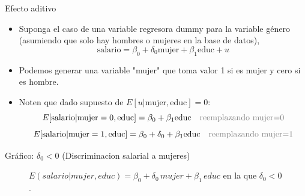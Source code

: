 \documentclass{beamer}
\begin{document}
\begin{frame}{Efecto aditivo}
    \begin{itemize}
        \item Suponga el caso de una variable regresora dummy para la variable género (asumiendo que solo hay hombres o mujeres en la base de datos),
        \[
        \text{salario} = \beta_0 + \delta_0 \text{mujer} + \beta_1 \text{educ} + u
        \]
        \item Podemos generar una variable "mujer" que toma valor 1 si es mujer y cero si es hombre.
        \item Noten que dado supuesto de \( E[u | \text{mujer}, \text{educ}] = 0 \):
        \[
        E[\text{salario} | \text{mujer} = 0, \text{educ}] = \beta_0 + \beta_1 \text{educ} \quad \textcolor{gray}{\text{reemplazando mujer=0}}
        \]
        \[
        E[\text{salario} | \text{mujer} = 1, \text{educ}] = \beta_0 + \delta_0 + \beta_1 \text{educ} \quad \textcolor{gray}{\text{reemplazando mujer=1}}
        \]
    \end{itemize}
\end{frame}


\begin{frame}{Gráfico: \(\delta_0 < 0\) (Discriminacion salarial a mujeres)}

\begin{figure}[h!]
\centering
{}
\caption{$E(salario| mujer, educ) = \beta_0 + \delta_0 \, mujer + \beta_1 \, educ$ en la que $\delta_0 < 0$.}
\label{fig:wage_genero}
\end{figure}
\end{frame}
\end{document}

